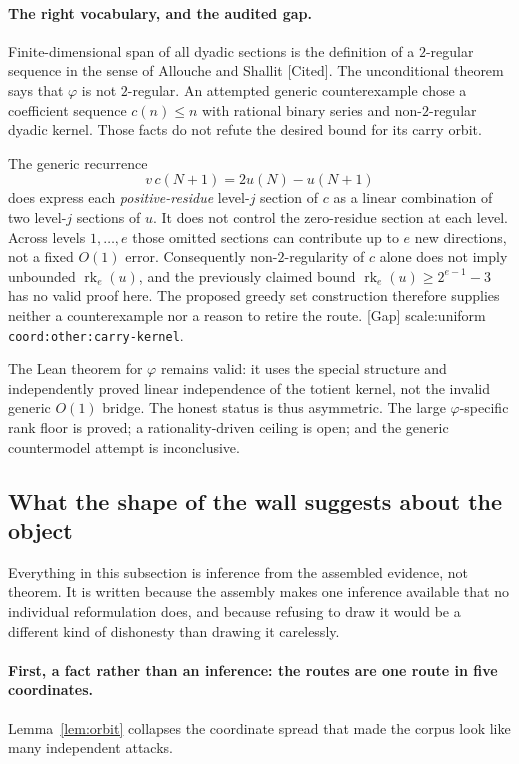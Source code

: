 \documentclass[11pt]{article}
\theoremstyle{plain}
\theoremstyle{definition}
\theoremstyle{remark}
\newcommand{\lean}[2]{\leanlink{#2}}
\newcommand{\ev}[1]{{\small\textsf{[#1]}}\xspace}
\newcommand{\scale}[1]{{\small\textsf{scale:#1}}\xspace}
\newcommand{\coord}[1]{\texorpdfstring{{\small\nolinkurl{coord:#1}}}{coord:#1}\xspace}
\begin{document}
\paragraph{The right vocabulary, and the audited gap.}
Finite-dimensional span of all dyadic sections is the definition of a
$2$-regular sequence in the sense of Allouche and Shallit \ev{Cited}.  The
unconditional theorem
\lean{Erdos249257.\allowbreak not_finiteDimensional_\allowbreak span_fullTotientKernel}{TotientMahlerDefect.lean:1145}
says that $\varphi$ is not $2$-regular.  An attempted generic counterexample
chose a coefficient sequence $c(n)\le n$ with rational binary series and
non-$2$-regular dyadic kernel.  Those facts do not refute the desired bound
for its carry orbit.

The generic recurrence
\[
  v\,c(N+1)=2u(N)-u(N+1)
\]
does express each \emph{positive-residue} level-$j$ section of $c$ as a
linear combination of two level-$j$ sections of $u$.  It does not control the
zero-residue section at each level.  Across levels $1,\ldots,e$ those omitted
sections can contribute up to $e$ new directions, not a fixed $O(1)$ error.
Consequently non-$2$-regularity of $c$ alone does not imply unbounded
$\operatorname{rk}_e(u)$, and the previously claimed bound
$\operatorname{rk}_e(u)\ge2^{e-1}-3$ has no valid proof here.  The proposed
greedy set construction therefore supplies neither a counterexample nor a
reason to retire the route. \ev{Gap} \scale{uniform}
\coord{other:carry-kernel}.

The Lean theorem for $\varphi$ remains valid: it uses the special structure
and independently proved linear independence of the totient kernel, not the
invalid generic $O(1)$ bridge.  The honest status is thus asymmetric.  The
large $\varphi$-specific rank floor is proved; a rationality-driven ceiling is
open; and the generic countermodel attempt is inconclusive.

\subsection{What the shape of the wall suggests about the object}\label{sub:shape}

Everything in this subsection is inference from the assembled evidence, not
theorem. It is written because the assembly makes one inference available
that no individual reformulation does, and because refusing to draw it would
be a different kind of dishonesty than drawing it carelessly.

\paragraph{First, a fact rather than an inference: the routes are one route
in five coordinates.}
Lemma~\ref{lem:orbit} collapses the coordinate spread that made the corpus
look like many independent attacks.
\end{document}

